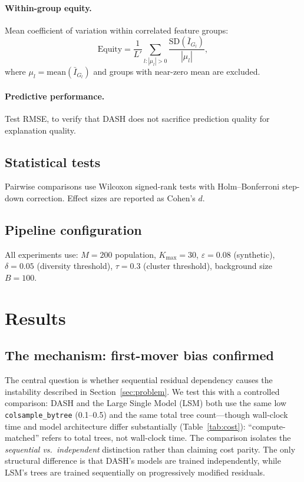 \documentclass[11pt]{article}
\newcommand{\dash}{\textsc{DASH}}
\begin{document}
\paragraph{Within-group equity.}
Mean coefficient of variation within correlated feature groups:
\begin{equation}
  \text{Equity} = \frac{1}{L'} \sum_{l : |\mu_l| > 0}
    \frac{\text{SD}(\bar{I}_{G_l})}{|\mu_l|},
\end{equation}
where $\mu_l = \text{mean}(\bar{I}_{G_l})$ and groups with near-zero
mean are excluded.

\paragraph{Predictive performance.}
Test RMSE, to verify that \dash{} does not sacrifice prediction quality
for explanation quality.

\subsection{Statistical tests}

Pairwise comparisons use Wilcoxon signed-rank tests with Holm--Bonferroni
step-down correction. Effect sizes are reported as Cohen's $d$.

\subsection{Pipeline configuration}

All experiments use: $M = 200$ population, $K_{\max} = 30$,
$\varepsilon = 0.08$ (synthetic), $\delta = 0.05$ (diversity threshold),
$\tau = 0.3$ (cluster threshold), background size $B = 100$.


\section{Results}
\label{sec:results}

\subsection{The mechanism: first-mover bias confirmed}
\label{sec:mechanism_result}

The central question is whether sequential residual dependency causes
the instability described in Section~\ref{sec:problem}. We test this
with a controlled comparison: \dash{} and the Large Single Model (LSM)
both use the same low \texttt{colsample\_bytree} (0.1--0.5) and the same
total tree count---though wall-clock time and model architecture differ
substantially (Table~\ref{tab:cost}): ``compute-matched'' refers to
total trees, not wall-clock time. The comparison isolates the
\emph{sequential vs.\ independent} distinction rather than claiming
cost parity. The only structural difference is that \dash{}'s models
are trained independently, while LSM's trees are trained sequentially
on progressively modified residuals.
\end{document}
